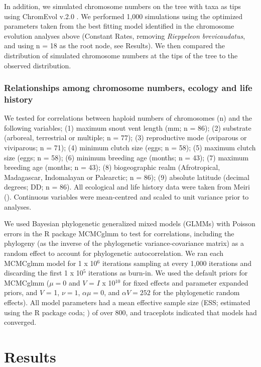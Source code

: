 \documentclass[a4paper, 12pt]{article}
\begin{document}
In addition, we simulated chromosome numbers on the tree with taxa as tips using ChromEvol v.2.0 \citep{glick2014chromevol,mayrose2010probabilistic}. 
We performed 1,000 simulations using the optimized parameters taken from the best fitting model identified in the chromosome evolution analyses above (Constant Rates, removing \textit{Rieppeleon brevicaudatus}, and using n = 18 as the root node, see Results). 
We then compared the distribution of simulated chromosome numbers at the tips of the tree to the observed distribution. 

\subsubsection{Relationships among chromosome numbers, ecology and life history}
We tested for correlations between haploid numbers of chromosomes (n) and the following variables; (1) maximum snout vent length (mm; n = 86); (2) substrate (arboreal, terrestrial or multiple; n = 77); (3) reproductive mode (oviparous or viviparous; n = 71); (4) minimum clutch size (eggs; n = 58); (5) maximum clutch size (eggs; n = 58); (6) minimum breeding age (months; n = 43); (7) maximum breeding age (months; n = 43); (8) biogeographic realm (Afrotropical, Madagascar, Indomalayan or Palearctic; n = 86); (9) absolute latitude (decimal degrees; DD; n = 86). 
All ecological and life history data were taken from Meiri (\citeyear{meiri2018traits}). 
Continuous variables were mean-centred and scaled to unit variance prior to analyses.

We used Bayesian phylogenetic generalized mixed models (GLMMs) with Poisson errors in the R package MCMCglmm \citep{hadfield2010mcmc} to test for correlations, including the phylogeny (as the inverse of the phylogenetic variance-covariance matrix) as a random effect to account for phylogenetic autocorrelation. 
We ran each MCMCglmm model for 1 x 10$^6$ iterations sampling at every 1,000 iterations and discarding the first 1 x 10$^5$ iterations as burn-in. 
We used the default priors for MCMCglmm ($\mu = 0$ and $V$ = $I$ x 10$^{10}$ for fixed effects and parameter expanded priors, and $V$ = 1, $\nu = 1$, $\alpha \mu = 0$, and $\alpha V = 252$ for the phylogenetic random effects). 
All model parameters had a mean effective sample size (ESS; estimated using the R package coda; \citealt{plummer2006coda}) of over 800, and traceplots indicated that models had converged.

\section{Results}
\end{document}
